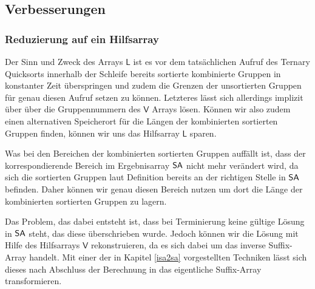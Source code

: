 \subsection{Verbesserungen}
\label{qsufsort:improv}
\subsubsection{Reduzierung auf ein Hilfsarray}
Der Sinn und Zweck des Arrays $\mathsf{L}$ ist es vor dem tatsächlichen Aufruf des Ternary Quicksorts innerhalb der Schleife bereits sortierte kombinierte Gruppen in konstanter Zeit überspringen und zudem die Grenzen der unsortierten Gruppen für genau diesen Aufruf setzen zu können. Letzteres lässt sich allerdings implizit über über die Gruppennummern des $\mathsf{V}$ Arrays lösen. Können wir also zudem einen alternativen Speicherort für die Längen der kombinierten sortierten Gruppen finden, können wir uns das Hilfsarray $\mathsf{L}$ sparen.

Was bei den Bereichen der kombinierten sortierten Gruppen auffällt ist, dass der korrespondierende Bereich im Ergebnisarray $\sa$ nicht mehr verändert wird, da sich die sortierten Gruppen laut Definition bereits an der richtigen Stelle in $\sa$ befinden. Daher können wir genau diesen Bereich nutzen um dort die Länge der kombinierten sortierten Gruppen zu lagern.

Das Problem, das dabei entsteht ist, dass bei Terminierung keine gültige Lösung in $\sa$ steht, das diese überschrieben wurde. Jedoch können wir die Lösung mit Hilfe des Hilfsarrays $\mathsf{V}$ rekonstruieren, da es sich dabei um das inverse Suffix-Array handelt. Mit einer der in Kapitel \ref{isa2sa} vorgestellten Techniken lässt sich dieses nach Abschluss der Berechnung in das eigentliche Suffix-Array transformieren.



